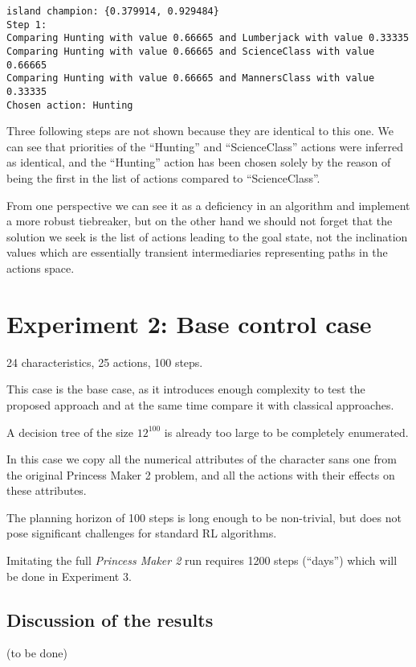 \documentclass[12pt, a4paper]{article}
\begin{document}
	\begin{verbatim}
island champion: {0.379914, 0.929484}
Step 1:
Comparing Hunting with value 0.66665 and Lumberjack with value 0.33335
Comparing Hunting with value 0.66665 and ScienceClass with value 0.66665
Comparing Hunting with value 0.66665 and MannersClass with value 0.33335
Chosen action: Hunting
	\end{verbatim}
	
	Three following steps are not shown because they are identical to this one.
	We can see that priorities of the ``Hunting'' and ``ScienceClass'' actions were inferred as identical,
	and the ``Hunting'' action has been chosen solely by the reason of being the first in the list of actions compared to ``ScienceClass''.
	
	From one perspective we can see it as a deficiency in an algorithm and implement a more robust tiebreaker, but on the other hand we should not forget that the solution we seek is the list of actions leading to the goal state,
	not the inclination values which are essentially transient intermediaries representing paths in the actions space.
	
	\section{Experiment 2: Base control case}
    
	24 characteristics, 25 actions, 100 steps.

	This case is the base case, as it introduces enough complexity to test the proposed approach and at the same time compare it with classical approaches.

	A decision tree of the size $12^{100}$ is already too large to be completely enumerated.

	In this case we copy all the numerical attributes of the character sans one from the original Princess Maker 2 problem, and all the actions with their effects on these attributes.
	
	The planning horizon of 100 steps is long enough to be non-trivial, but does not pose significant challenges for standard RL algorithms.

	Imitating the full \textit{Princess Maker 2} run requires 1200 steps (``days'') which will be done in Experiment 3.
	
	
	\subsection{Discussion of the results}
		(to be done)
		
\end{document}
